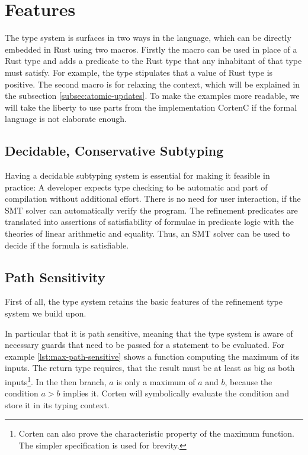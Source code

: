 \documentclass[twoside, english]{sdqthesis}
\theoremstyle{definition}
\begin{document}
\section{Features}


The type system is surfaces in two ways in the language, which can be directly embedded in Rust using two macros. Firstly the macro  can be used in place of a Rust type and adds a predicate to the Rust type that any inhabitant of that type must satisfy. For example, the type  stipulates that a value of Rust type  is positive. The second macro is  for relaxing the context, which will be explained in the subsection \ref{subsec:atomic-updates}.
To make the examples more readable, we will take the liberty to use parts from the implementation CortenC if the formal language is not elaborate enough.

\subsection{Decidable, Conservative Subtyping}

Having a decidable subtyping system is essential for making it feasible in practice: A developer expects type checking to be automatic and part of compilation without additional effort. There is no need for user interaction, if the SMT solver can automatically verify the program.
The refinement predicates are translated into assertions of satisfiability of formulae in predicate logic with the theories of linear arithmetic and equality. Thus, an SMT solver can be used to decide if the formula is satisfiable.


\label{subsec:path-sensitivify}\subsection{Path Sensitivity}

First of all, the type system retains the basic features of the refinement type system we build upon.

In particular that it is path sensitive, meaning that the type system is aware of necessary guards that need to be passed for a statement to be evaluated. For example \cref{lst:max-path-sensitive} shows a function computing the maximum of its inputs. 
The return type requires, that the result must be at least as big as both inputs\footnote{Corten can also prove the characteristic property of the maximum function. The simpler specification is used for brevity.}. In the then branch, $a$ is only a maximum of $a$ and $b$, because the condition $a > b$ implies it. Corten will symbolically evaluate the condition and store it in its typing context.
\end{document}
